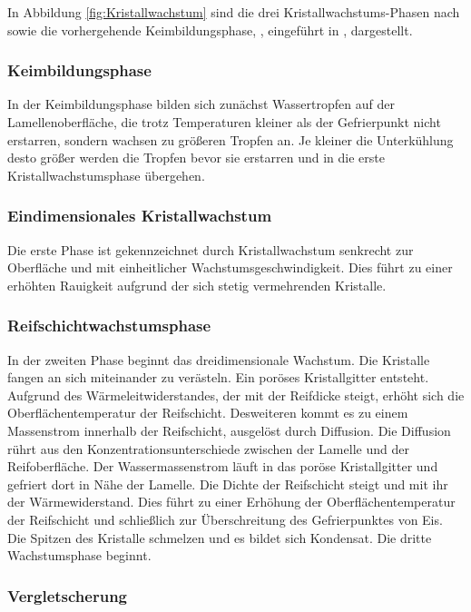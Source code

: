 In Abbildung \ref{fig:Kristallwachstum} sind die drei Kristallwachstums-Phasen nach \textsc{\citeauthor{Hayashi1977}} sowie die vorhergehende Keimbildungsphase, , eingeführt in \citep{Sahinagic2004}, dargestellt. 

\subsubsection*{Keimbildungsphase}

In der Keimbildungsphase bilden sich zunächst Wassertropfen auf der Lamellenoberfläche, die trotz Temperaturen kleiner als der Gefrierpunkt nicht erstarren, sondern wachsen zu größeren Tropfen an. Je kleiner die Unterkühlung desto größer werden die Tropfen bevor sie erstarren und in die erste Kristallwachstumsphase übergehen. 

\subsubsection*{Eindimensionales Kristallwachstum}
Die erste Phase ist gekennzeichnet durch Kristallwachstum senkrecht zur Oberfläche und mit einheitlicher Wachstumsgeschwindigkeit. Dies führt zu einer erhöhten Rauigkeit aufgrund der sich stetig vermehrenden Kristalle. 

\subsubsection*{Reifschichtwachstumsphase}
In der zweiten Phase beginnt das dreidimensionale Wachstum. Die Kristalle fangen an sich miteinander zu verästeln. Ein poröses Kristallgitter entsteht. Aufgrund des  Wärmeleitwiderstandes, der mit der Reifdicke steigt, erhöht sich die Oberflächentemperatur der Reifschicht. Desweiteren kommt es zu einem Massenstrom innerhalb der Reifschicht, ausgelöst durch Diffusion. Die Diffusion rührt aus  den  Konzentrationsunterschiede zwischen der Lamelle und der Reifoberfläche. Der Wassermassenstrom läuft in das poröse Kristallgitter und gefriert dort in Nähe der Lamelle. Die Dichte der Reifschicht steigt und mit ihr der Wärmewiderstand. Dies führt zu einer Erhöhung der Oberflächentemperatur der Reifschicht und schließlich zur Überschreitung des Gefrierpunktes von Eis. Die Spitzen des Kristalle schmelzen und es bildet sich Kondensat. Die dritte Wachstumsphase beginnt. 

\subsubsection*{Vergletscherung}

